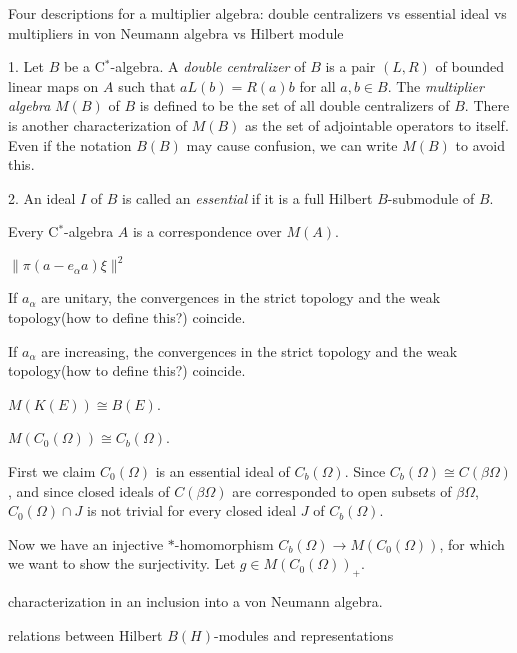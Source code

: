 \documentclass{../../large}
\begin{document}
\begin{prb}
Four descriptions for a multiplier algebra:
double centralizers vs essential ideal vs multipliers in von Neumann algebra vs Hilbert module

1.
Let $B$ be a C$^*$-algebra.
A \emph{double centralizer} of $B$ is a pair $(L,R)$ of bounded linear maps on $A$ such that $aL(b)=R(a)b$ for all $a,b\in B$.
The \emph{multiplier algebra} $M(B)$ of $B$ is defined to be the set of all double centralizers of $B$.
There is another characterization of $M(B)$ as the set of adjointable operators to itself.
Even if the notation $B(B)$ may cause confusion, we can write $M(B)$ to avoid this.

2.
An ideal $I$ of $B$ is called an \emph{essential} if it is a full Hilbert $B$-submodule of $B$.



Every C$^*$-algebra $A$ is a correspondence over $M(A)$.

\begin{parts}
\item $\|\pi(a-e_\alpha a)\xi\|^2$
\item If $a_\alpha$ are unitary, the convergences in the strict topology and the weak topology(how to define this?) coincide.
\item If $a_\alpha$ are increasing, the convergences in the strict topology and the weak topology(how to define this?) coincide.
\item $M(K(E))\cong B(E)$.
\item $M(C_0(\Omega))\cong C_b(\Omega)$.
\end{parts}
\end{prb}
\begin{pf}
First we claim $C_0(\Omega)$ is an essential ideal of $C_b(\Omega)$.
Since $C_b(\Omega)\cong C(\beta\Omega)$, and since closed ideals of $C(\beta\Omega)$ are corresponded to open subsets of $\beta\Omega$, $C_0(\Omega)\cap J$ is not trivial for every closed ideal $J$ of $C_b(\Omega)$.

Now we have an injective $*$-homomorphism $C_b(\Omega)\to M(C_0(\Omega))$, for which we want to show the surjectivity.
Let $g\in M(C_0(\Omega))_+$.


\end{pf}

characterization in an inclusion into a von Neumann algebra.

relations between Hilbert $B(H)$-modules and representations
\end{document}
